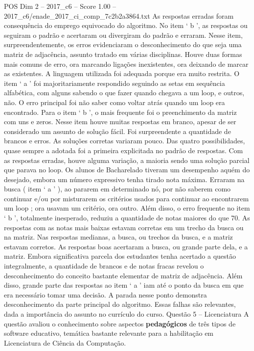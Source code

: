 \begin{textsample}{POS Dim 2 – 2017\_c6 – Score 1.00 – 2017\_c6/enade\_2017\_ci\_comp\_7c2b2a3864.txt}
As respostas erradas foram consequência do emprego equivocado do algoritmo.
No item ‘ b ’, as respostas ou seguiram o padrão e acertaram ou divergiram do padrão e erraram.
Nesse item, surpreendentemente, os erros evidenciaram o desconhecimento do que seja uma matriz de adjacência, assunto tratado em várias disciplinas.
Houve duas formas mais comuns de erro, ora marcando ligações inexistentes, ora deixando de marcar as existentes.
A linguagem utilizada foi adequada porque era muito restrita.
O item ‘ a ’ foi majoritariamente respondido seguindo as setas em sequência alfabética, com alguns sabendo o que fazer quando chegava a um loop, e outros, não.
O erro principal foi não saber como voltar atrás quando um loop era encontrado.
Para o item ‘ b ’, o mais frequente foi o preenchimento da matriz com uns e zeros.
Nesse item houve muitas respostas em branco, apesar de ser considerado um assunto de solução fácil.
Foi surpreendente a quantidade de brancos e erros.
As soluções corretas variaram pouco.
Das quatro possibilidades, quase sempre a adotada foi a primeira explicitada no padrão de respostas.
Com as respostas erradas, houve alguma variação, a maioria sendo uma solução parcial que parava no loop.
Os alunos de Bacharelado tiveram um desempenho aquém do desejado, embora um número expressivo tenha tirado nota máxima.
Erraram na busca ( item ‘ a ’ ), ao pararem em determinado nó, por não saberem como continuar e/ou por misturarem os critérios usados para continuar ao encontrarem um loop ; ora usavam um critério, ora outro.
Além disso, o erro frequente no item ‘ b ’, totalmente inesperado, reduziu a quantidade de notas maiores do que 70.
As respostas com as notas mais baixas estavam corretas em um trecho da busca ou na matriz.
Nas respostas medianas, a busca, ou trechos da busca, e a matriz estavam corretos.
As respostas boas acertaram a busca, ou grande parte dela, e a matriz.
Embora significativa parcela dos estudantes tenha acertado a questão integralmente, a quantidade de brancos e de notas fracas revelou o desconhecimento do conceito bastante elementar de matriz de adjacência.
Além disso, grande parte das respostas ao item ‘ a ’ iam até o ponto da busca em que era necessário tomar uma decisão.
A parada nesse ponto demonstra desconhecimento da parte principal do algoritmo.
Essas falhas são relevantes, dada a importância do assunto no currículo do curso.
Questão 5 – Licenciatura A questão avaliou o conhecimento sobre aspectos \textbf{pedagógicos} de três tipos de software educativo, temática bastante relevante para a habilitação em Licenciatura de Ciência da Computação.

\end{textsample}
